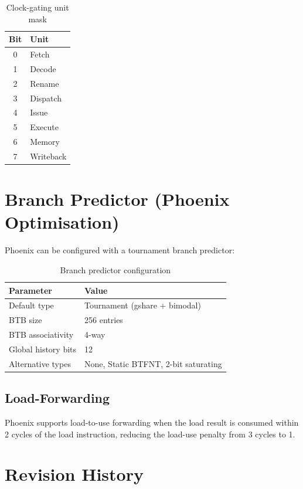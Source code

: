 \documentclass[11pt,a4paper]{article}
\begin{document}
\begin{table}[H]
\centering
\caption{Clock-gating unit mask}
\begin{tabular}{cl}
\toprule
Bit & Unit \\
\midrule
0 & Fetch \\
1 & Decode \\
2 & Rename \\
3 & Dispatch \\
4 & Issue \\
5 & Execute \\
6 & Memory \\
7 & Writeback \\
\bottomrule
\end{tabular}
\end{table}

\newpage

\section{Branch Predictor (Phoenix Optimisation)}

Phoenix can be configured with a tournament branch predictor:

\begin{table}[H]
\centering
\caption{Branch predictor configuration}
\begin{tabular}{ll}
\toprule
Parameter & Value \\
\midrule
Default type & Tournament (gshare + bimodal) \\
BTB size & 256 entries \\
BTB associativity & 4-way \\
Global history bits & 12 \\
Alternative types & None, Static BTFNT, 2-bit saturating \\
\bottomrule
\end{tabular}
\end{table}

\subsection{Load-Forwarding}

Phoenix supports load-to-use forwarding when the load result is consumed
within 2 cycles of the load instruction, reducing the load-use penalty
from 3 cycles to 1.

\newpage

\section{Revision History}
\end{document}
